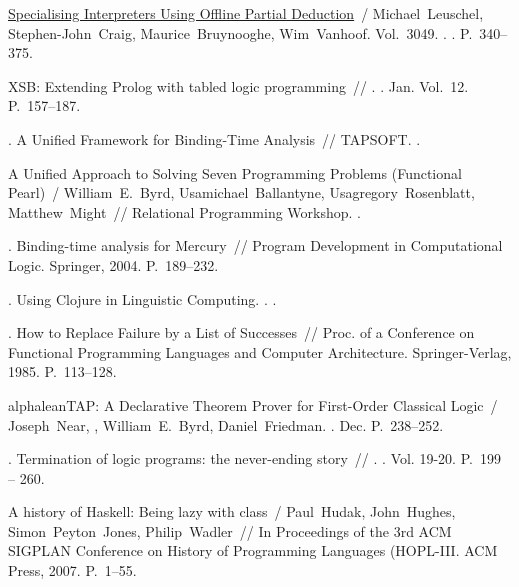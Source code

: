 \begin{thebibliography}{10}
  \href{http://dx.doi.org/10.1007/978-3-540-25951-0_11}{Specialising Interpreters
    Using Offline Partial Deduction}~/ Michael~Leuschel, Stephen-John~Craig,
    Maurice~Bruynooghe, Wim~Vanhoof. \BibDash
  \newblock Vol.~3049. \BibDash
  . . \BibDash
  \newblock P.~340--375.

   XSB: Extending Prolog with tabled
    logic programming~// .
    \BibDash
  . \BibDash Jan. \BibDash
  \newblock Vol.~12. \BibDash
  \newblock P.~157--187.

  . A Unified Framework for Binding-Time Analysis~//
    TAPSOFT. \BibDash
  .

  A Unified Approach to Solving Seven Programming Problems (Functional Pearl)~/
    William~E.~Byrd, Usamichael~Ballantyne, Usagregory~Rosenblatt,
    Matthew~Might~// Relational Programming Workshop. \BibDash
  .

  . Binding-time
    analysis for Mercury~// Program Development in Computational Logic. \BibDash
  \newblock Springer, 2004. \BibDash
  \newblock P.~189--232.

  . Using Clojure in
    Linguistic Computing. \BibDash
  . .

  . How to Replace Failure by a List of Successes~// Proc.
    of a Conference on Functional Programming Languages and Computer
    Architecture. \BibDash
  \newblock Springer-Verlag, 1985. \BibDash
  \newblock P.~113–128.

  alphaleanTAP: A Declarative Theorem Prover for First-Order Classical Logic~/
    Joseph~Near, , William~E.~Byrd, Daniel~Friedman. \BibDash
  . \BibDash Dec. \BibDash
  \newblock P.~238--252.

  . Termination of logic programs: the
    never-ending story~// . \BibDash
  . \BibDash
  \newblock Vol. 19-20. \BibDash
  \newblock P.~199 -- 260.

  A history of Haskell: Being lazy with class~/ Paul~Hudak, John~Hughes,
    Simon~Peyton~Jones, Philip~Wadler~// In Proceedings of the 3rd ACM SIGPLAN
    Conference on History of Programming Languages (HOPL-III. \BibDash
  \newblock ACM Press, 2007. \BibDash
  \newblock P.~1--55.

  \end{thebibliography}